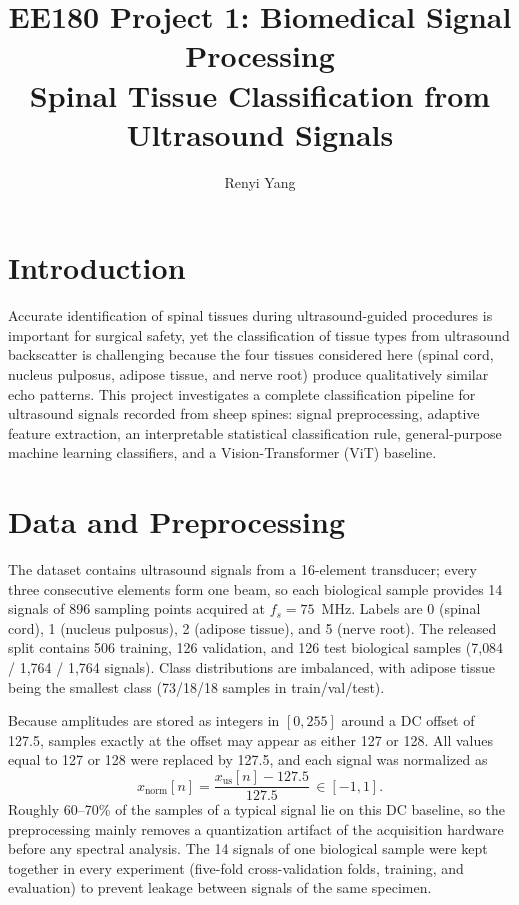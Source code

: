 \documentclass[11pt]{article}
\title{\vspace{-2em}EE180 Project 1: Biomedical Signal Processing\\\large Spinal Tissue Classification from Ultrasound Signals}
\author{Renyi Yang \qquad 2023533030}
\date{}
\begin{document}
\maketitle

\section{Introduction}

Accurate identification of spinal tissues during ultrasound-guided procedures is
important for surgical safety, yet the classification of tissue types from
ultrasound backscatter is challenging because the four tissues considered here
(spinal cord, nucleus pulposus, adipose tissue, and nerve root) produce
qualitatively similar echo patterns. This project investigates a complete
classification pipeline for ultrasound signals recorded from sheep spines:
signal preprocessing, adaptive feature extraction, an interpretable statistical
classification rule, general-purpose machine learning classifiers, and a
Vision-Transformer (ViT) baseline.

\section{Data and Preprocessing}

The dataset contains ultrasound signals from a 16-element transducer; every
three consecutive elements form one beam, so each biological sample provides
14 signals of 896 sampling points acquired at $f_s = 75$~MHz. Labels are
0 (spinal cord), 1 (nucleus pulposus), 2 (adipose tissue), and 5 (nerve root).
The released split contains 506 training, 126 validation, and 126 test
biological samples (7{,}084 / 1{,}764 / 1{,}764 signals). Class distributions
are imbalanced, with adipose tissue being the smallest class
(73/18/18 samples in train/val/test).

Because amplitudes are stored as integers in $[0,255]$ around a DC offset of
127.5, samples exactly at the offset may appear as either 127 or 128. All values
equal to 127 or 128 were replaced by 127.5, and each signal was normalized as
\begin{equation}
    x_{\mathrm{norm}}[n]=\frac{x_{\mathrm{us}}[n]-127.5}{127.5}\,\in[-1,1].
\end{equation}
Roughly 60--70\% of the samples of a typical signal lie on this DC baseline,
so the preprocessing mainly removes a quantization artifact of the acquisition
hardware before any spectral analysis. The 14 signals of one biological sample
were kept together in every experiment (five-fold cross-validation folds,
training, and evaluation) to prevent leakage between signals of the same
specimen.
\end{document}
